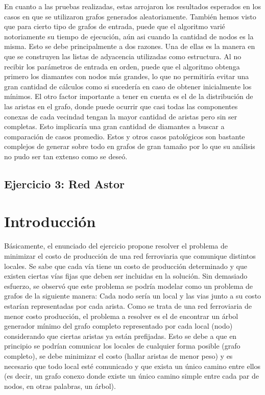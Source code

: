 \documentclass[a4paper,11pt] {article}
\begin{document}
En cuanto a las pruebas realizadas, estas arrojaron los resultados esperados en los casos en que se utilizaron grafos generados aleatoriamente. Tambi\'en hemos visto que para cierto tipo de grafos de entrada, puede que el algoritmo vari\'e notoriamente su tiempo de ejecuci\'on, a\'un asi cuando la cantidad de nodos es la misma. Esto se debe principalmente a dos razones. Una de ellas es la manera en que se construyen las listas de adyacencia utilizadas como estructura. Al no recibir los par\'ametros de entrada en orden, puede que el algoritmo obtenga primero los diamantes con nodos m\'as grandes, lo que no permitir\'ia evitar una gran cantidad de c\'alculos como si suceder\'ia en caso de obtener inicialmente los m\'inimos. El otro factor importante a tener en cuenta es el de la distribuci\'on de las aristas en el grafo, donde puede ocurrir que casi todas las componentes conexas de cada vecindad tengan la mayor cantidad de aristas pero sin ser completas. Esto implicar\'ia una gran cantidad de diamantes a buscar a comparaci\'on de casos promedio. Estos y otros casos patol\'ogicos son bastante complejos de generar sobre todo en grafos de gran tama\~{n}o por lo que su an\'alisis no pudo ser tan extenso como se dese\'o.

\begin{center}
\section*{Ejercicio 3: Red Astor}
\end{center}

\bigskip
\section*{Introducci\'on}

Básicamente, el enunciado del ejercicio propone resolver el problema de minimizar el costo de producción de una red ferroviaria que comunique distintos locales. Se sabe que cada vía tiene un costo de producción determinado y que existen ciertas vías fijas que deben ser incluidas en la solución. Sin demasiado esfuerzo, se observó que este problema se podría modelar como un problema de grafos de la siguiente manera: Cada nodo sería un local y las vias junto a su costo estarían representadas por cada arista. Como se trata de una red ferroviaria de menor costo producción, el problema a resolver es el de encontrar un árbol generador mínimo del grafo completo representado por cada local (nodo) considerando que ciertas aristas ya están prefijadas. Esto se debe a que en principio se podrían comunicar los locales de cualquier forma posible (grafo completo), se debe minimizar el costo (hallar aristas de menor peso) y es necesario que todo local esté comunicado y que exista un único camino entre ellos (es decir, un grafo conexo donde existe un único camino simple entre cada par de nodos, en otras palabras, un árbol).
\end{document}
